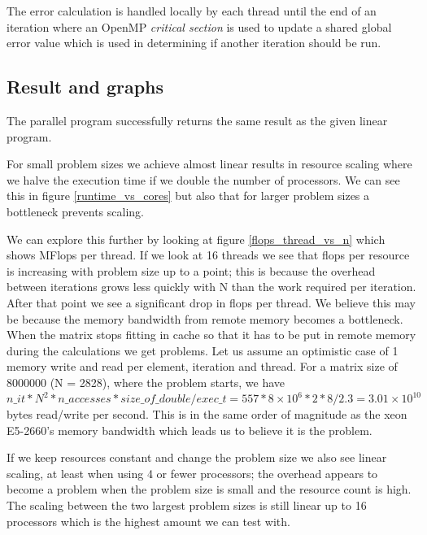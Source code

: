 \documentclass[a4paper,11pt]{article}
\begin{document}
The error calculation is handled locally by each thread until the end of an iteration where an OpenMP \emph{critical section} is used to update a shared global error value which is used in determining if another iteration should be run.

\subsection{Result and graphs}
The parallel program successfully returns the same result as the given linear program.

For small problem sizes we achieve almost linear results in resource scaling where we halve the execution time if we double the number of processors. We can see this in figure \ref{runtime_vs_cores} but also that for larger problem sizes a bottleneck prevents scaling. 

We can explore this further by looking at figure \ref{flops_thread_vs_n} which shows MFlops per thread. If we look at 16 threads we see that flops per resource is increasing with problem size up to a point; this is because the overhead between iterations grows less quickly with N than the work required per iteration. After that point we see a significant drop in flops per thread. We believe this may be because the memory bandwidth from remote memory becomes a bottleneck. When the matrix stops fitting in cache so that it has to be put in remote memory during the calculations we get problems. Let us assume an optimistic case of 1 memory write and read per element, iteration and thread. For a matrix size of 8000000 (N = 2828), where the problem starts, we have $n\_it*N^2*n\_accesses*size\_of\_double/exec\_t=557*8\times10^{6}*2*8/2.3=3.01\times10^{10}$ bytes read/write per second. This is in the same order of magnitude as the xeon E5-2660's memory bandwidth which leads us to believe it is the problem.

If we keep resources constant and change the problem size we also see linear scaling, at least when using 4 or fewer processors; the overhead appears to become a problem when the problem size is small and the resource count is high. The scaling between the two largest problem sizes is still linear up to 16 processors which is the highest amount we can test with.
\end{document}
